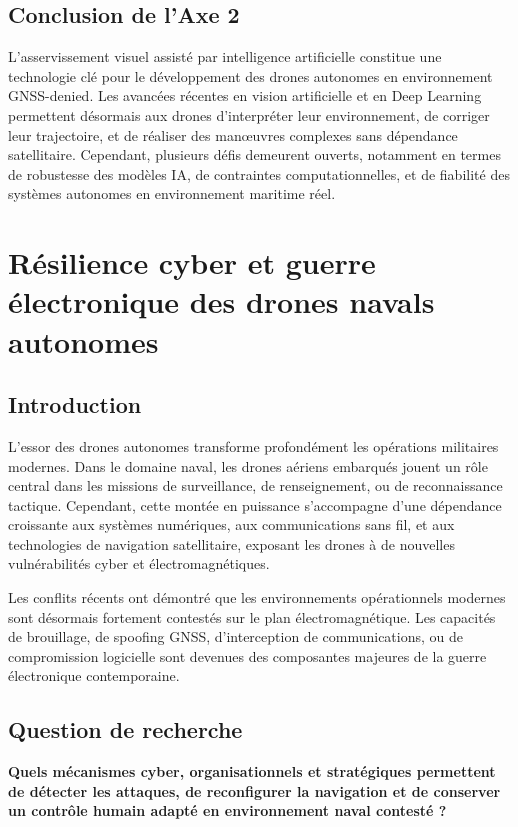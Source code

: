 \documentclass[12pt, a4paper, twoside, openright]{report}
\begin{document}
\section{Conclusion de l'Axe 2}
L’asservissement visuel assisté par intelligence artificielle constitue une technologie clé pour le développement des drones autonomes en environnement GNSS-denied. Les avancées récentes en vision artificielle et en Deep Learning permettent désormais aux drones d’interpréter leur environnement, de corriger leur trajectoire, et de réaliser des manœuvres complexes sans dépendance satellitaire. Cependant, plusieurs défis demeurent ouverts, notamment en termes de robustesse des modèles IA, de contraintes computationnelles, et de fiabilité des systèmes autonomes en environnement maritime réel.

\cleardoublepage

\chapter{Résilience cyber et guerre électronique des drones navals autonomes}\label{chap:axe3}

\section{Introduction}
L’essor des drones autonomes transforme profondément les opérations militaires modernes. Dans le domaine naval, les drones aériens embarqués jouent un rôle central dans les missions de surveillance, de renseignement, ou de reconnaissance tactique. Cependant, cette montée en puissance s’accompagne d’une dépendance croissante aux systèmes numériques, aux communications sans fil, et aux technologies de navigation satellitaire, exposant les drones à de nouvelles vulnérabilités cyber et électromagnétiques.

Les conflits récents ont démontré que les environnements opérationnels modernes sont désormais fortement contestés sur le plan électromagnétique. Les capacités de brouillage, de spoofing GNSS, d’interception de communications, ou de compromission logicielle sont devenues des composantes majeures de la guerre électronique contemporaine.

\section{Question de recherche}
\begin{framed}
    \textbf{Quels mécanismes cyber, organisationnels et stratégiques permettent de détecter les attaques, de reconfigurer la navigation et de conserver un contrôle humain adapté en environnement naval contesté ?}
\end{framed}
\end{document}

